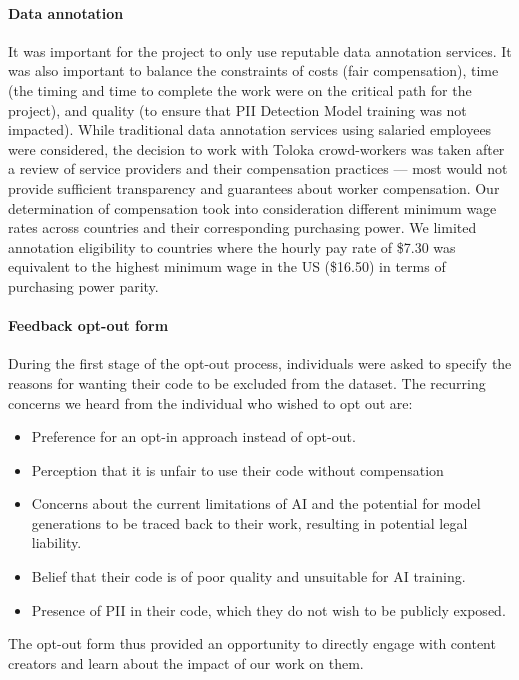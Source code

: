 \documentclass[10pt]{article} %
\begin{document}
\paragraph{Data annotation} It was important for the project to only use reputable data annotation services. It was also important to balance the constraints of costs (fair compensation), time (the timing and time to complete the work were on the critical path for the project), and quality (to ensure that PII Detection Model training was not impacted). While traditional data annotation services using salaried employees were considered, the decision to work with Toloka crowd-workers was taken after a review of service providers and their compensation practices --- most would not provide sufficient transparency and guarantees about worker compensation. Our determination of compensation took into consideration different minimum wage rates across countries and their corresponding purchasing power. We limited annotation eligibility to countries where the hourly pay rate of \$7.30 was equivalent to the highest minimum wage in the US (\$16.50) in terms of purchasing power parity. 

\paragraph{Feedback opt-out form}
During the first stage of the opt-out process, individuals were asked to specify the reasons for wanting their code to be excluded from the dataset. The recurring concerns we heard from the individual who wished to opt out are:
\begin{itemize}
    \item Preference for an opt-in approach instead of opt-out.
    \item Perception that it is unfair to use their code without compensation
    \item Concerns about the current limitations of AI and the potential for model generations to be traced back to their work, resulting in potential legal liability.
    \item Belief that their code is of poor quality and unsuitable for AI training.
    \item Presence of PII in their code, which they do not wish to be publicly exposed.
\end{itemize}
The opt-out form thus provided an opportunity to directly engage with content creators and learn about the impact of our work on them.  
\end{document}
